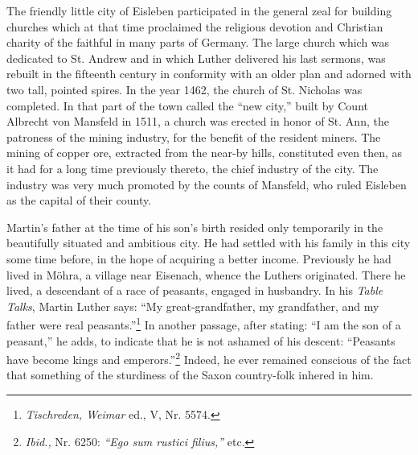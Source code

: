 The friendly little city of Eisleben participated in the general zeal
for building churches which at that time proclaimed the religious devotion and Christian charity of the faithful in many parts of Germany. The large church which was dedicated to St. Andrew and in which Luther delivered his last sermons,
was rebuilt in the fifteenth century in conformity with an older plan and adorned with two tall,
pointed spires. In the year 1462, the church of St. Nicholas was completed. In that part of the town called the “new city,” built by Count
Albrecht von Mansfeld in 1511, a church was erected in honor of St.
Ann, the patroness of the mining industry, for the benefit of the
resident miners. The mining of copper ore, extracted from the near-by
hills, constituted even then, as it had for a long time previously thereto,
the chief industry of the city. The industry was very much promoted
by the counts of Mansfeld, who ruled Eisleben as the capital of their
county.

Martin’s father at the time of his son’s birth resided only temporarily in the beautifully situated and ambitious city.
He had settled with his family in this city some time before, in the hope of acquiring a better income.
Previously he had lived in Möhra, a village near Eisenach, whence the Luthers originated.
There he lived, a descendant of a race of peasants, engaged in husbandry.
In his \textit{Table Talks}, Martin Luther says: “My great-grandfather, my grandfather,
and my father were real peasants.”\footnote{\textit{Tischreden, Weimar} ed., V, Nr. 5574.}
In another passage, after stating:
“I am the son of a peasant,” he adds, to indicate that he is not ashamed
of his descent: “Peasants have become kings and emperors.”\footnote{\textit{Ibid.,} Nr. 6250: \textit{“Ego sum rustici filius,”} etc.}
Indeed, he ever remained conscious of the fact that something of the sturdiness of the Saxon country-folk inhered in him.

